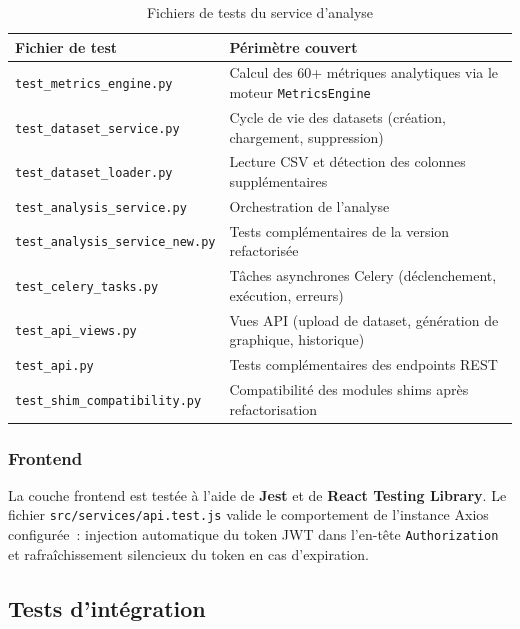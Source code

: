 \begin{table}[H]
\centering
\small
\caption{Fichiers de tests du service d'analyse}
\label{tab:tests-analyze}
\begin{tabular}{|>{\raggedright\arraybackslash}p{6cm}
                |>{\raggedright\arraybackslash}p{7cm}|}
\hline
\textbf{Fichier de test} & \textbf{Périmètre couvert} \\
\hline
\texttt{test\_metrics\_engine.py} & Calcul des 60+ métriques analytiques via le moteur \texttt{MetricsEngine} \\
\hline
\texttt{test\_dataset\_service.py} & Cycle de vie des datasets (création, chargement, suppression) \\
\hline
\texttt{test\_dataset\_loader.py} & Lecture CSV et détection des colonnes supplémentaires \\
\hline
\texttt{test\_analysis\_service.py} & Orchestration de l'analyse \\
\hline
\texttt{test\_analysis\_service\_new.py} & Tests complémentaires de la version refactorisée \\
\hline
\texttt{test\_celery\_tasks.py} & Tâches asynchrones Celery (déclenchement, exécution, erreurs) \\
\hline
\texttt{test\_api\_views.py} & Vues API (upload de dataset, génération de graphique, historique) \\
\hline
\texttt{test\_api.py} & Tests complémentaires des endpoints REST \\
\hline
\texttt{test\_shim\_compatibility.py} & Compatibilité des modules shims après refactorisation \\
\hline
\end{tabular}
\end{table}

\subsubsection*{Frontend}

La couche frontend est testée à l'aide de \textbf{Jest} et de \textbf{React Testing Library}.
Le fichier \texttt{src/services/api.test.js} valide le comportement de l'instance Axios
configurée~: injection automatique du token JWT dans l'en-tête \texttt{Authorization} et
rafraîchissement silencieux du token en cas d'expiration.

\subsection{Tests d'intégration}

